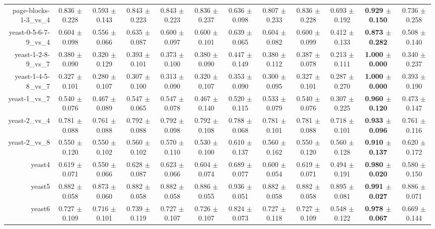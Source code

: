 \begin{table}[!ht]
{\begin{tabular}{r c c c c c c c c c c c}
page-blocks-1-3\_vs\_4 & 0.836 $\pm$ 0.228 & 0.593 $\pm$ 0.143 & 0.843 $\pm$ 0.223 & 0.843 $\pm$ 0.223 & 0.836 $\pm$ 0.237 & 0.636 $\pm$ 0.098 & 0.807 $\pm$ 0.233 & 0.836 $\pm$ 0.228 & 0.693 $\pm$ 0.192 & \textbf{0.929 $\pm$ 0.150} & 0.736 $\pm$ 0.258 \\
yeast-0-5-6-7-9\_vs\_4 & 0.604 $\pm$ 0.098 & 0.556 $\pm$ 0.066 & 0.635 $\pm$ 0.087 & 0.600 $\pm$ 0.097 & 0.600 $\pm$ 0.101 & 0.639 $\pm$ 0.065 & 0.604 $\pm$ 0.082 & 0.600 $\pm$ 0.099 & 0.412 $\pm$ 0.133 & \textbf{0.873 $\pm$ 0.282} & 0.508 $\pm$ 0.140 \\
yeast-1-2-8-9\_vs\_7 & 0.380 $\pm$ 0.090 & 0.320 $\pm$ 0.129 & 0.393 $\pm$ 0.101 & 0.373 $\pm$ 0.100 & 0.380 $\pm$ 0.090 & 0.447 $\pm$ 0.149 & 0.380 $\pm$ 0.112 & 0.387 $\pm$ 0.078 & 0.213 $\pm$ 0.111 & \textbf{1.000 $\pm$ 0.000} & 0.340 $\pm$ 0.237 \\
yeast-1-4-5-8\_vs\_7 & 0.327 $\pm$ 0.101 & 0.280 $\pm$ 0.107 & 0.307 $\pm$ 0.100 & 0.313 $\pm$ 0.090 & 0.320 $\pm$ 0.107 & 0.353 $\pm$ 0.090 & 0.300 $\pm$ 0.095 & 0.327 $\pm$ 0.101 & 0.287 $\pm$ 0.270 & \textbf{1.000 $\pm$ 0.000} & 0.393 $\pm$ 0.190 \\
yeast-1\_vs\_7 & 0.540 $\pm$ 0.076 & 0.467 $\pm$ 0.089 & 0.547 $\pm$ 0.065 & 0.547 $\pm$ 0.078 & 0.467 $\pm$ 0.140 & 0.520 $\pm$ 0.115 & 0.533 $\pm$ 0.079 & 0.540 $\pm$ 0.076 & 0.307 $\pm$ 0.225 & \textbf{0.960 $\pm$ 0.120} & 0.473 $\pm$ 0.147 \\
yeast-2\_vs\_4 & 0.781 $\pm$ 0.088 & 0.761 $\pm$ 0.088 & 0.792 $\pm$ 0.088 & 0.792 $\pm$ 0.098 & 0.792 $\pm$ 0.108 & 0.788 $\pm$ 0.068 & 0.781 $\pm$ 0.101 & 0.781 $\pm$ 0.088 & 0.718 $\pm$ 0.101 & \textbf{0.933 $\pm$ 0.096} & 0.761 $\pm$ 0.116 \\
yeast-2\_vs\_8 & 0.550 $\pm$ 0.120 & 0.550 $\pm$ 0.102 & 0.560 $\pm$ 0.102 & 0.570 $\pm$ 0.110 & 0.530 $\pm$ 0.100 & 0.610 $\pm$ 0.137 & 0.560 $\pm$ 0.162 & 0.550 $\pm$ 0.120 & 0.560 $\pm$ 0.128 & \textbf{0.910 $\pm$ 0.137} & 0.620 $\pm$ 0.172 \\
yeast4 & 0.619 $\pm$ 0.071 & 0.550 $\pm$ 0.066 & 0.628 $\pm$ 0.087 & 0.623 $\pm$ 0.066 & 0.604 $\pm$ 0.074 & 0.689 $\pm$ 0.077 & 0.600 $\pm$ 0.054 & 0.619 $\pm$ 0.071 & 0.494 $\pm$ 0.191 & \textbf{0.980 $\pm$ 0.020} & 0.580 $\pm$ 0.150 \\
yeast5 & 0.882 $\pm$ 0.058 & 0.873 $\pm$ 0.060 & 0.882 $\pm$ 0.058 & 0.882 $\pm$ 0.058 & 0.886 $\pm$ 0.055 & 0.936 $\pm$ 0.051 & 0.882 $\pm$ 0.058 & 0.882 $\pm$ 0.058 & 0.895 $\pm$ 0.081 & \textbf{0.991 $\pm$ 0.027} & 0.886 $\pm$ 0.071 \\
yeast6 & 0.727 $\pm$ 0.109 & 0.716 $\pm$ 0.101 & 0.739 $\pm$ 0.119 & 0.727 $\pm$ 0.107 & 0.726 $\pm$ 0.107 & 0.824 $\pm$ 0.073 & 0.727 $\pm$ 0.118 & 0.727 $\pm$ 0.109 & 0.548 $\pm$ 0.122 & \textbf{0.978 $\pm$ 0.067} & 0.669 $\pm$ 0.144 \\

\end{tabular}}
\end{table}

